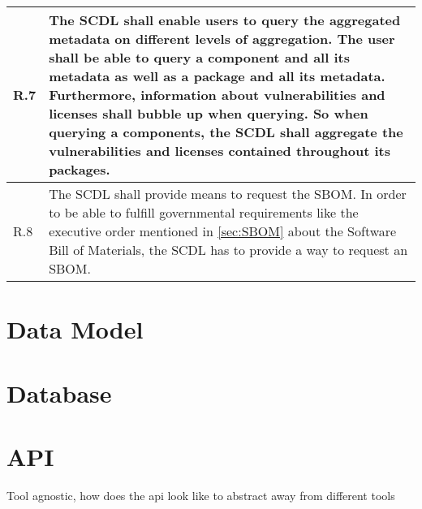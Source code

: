 \begin{xltabular}{\linewidth}{|l|X|}
	\hline
	R.7 & The SCDL shall enable users to query the aggregated metadata on different levels of aggregation.\newline\newline
	The user shall be able to query a component and all its metadata as well as a package and all its metadata. Furthermore, information about vulnerabilities and licenses shall bubble up when querying. So when querying a components, the SCDL shall aggregate the vulnerabilities and licenses contained throughout its packages. 
	\\
	\hline
	R.8 & The SCDL shall provide means to request the SBOM.\newline\newline
	In order to be able to fulfill governmental requirements like the executive order mentioned in \ref{sec:SBOM} about the Software Bill of Materials, the SCDL has to provide a way to request an SBOM.\\
	\hline
\end{xltabular}




\section{Data Model}

\section{Database}
\section{API}
Tool agnostic, how does the api look like to abstract away from different tools
